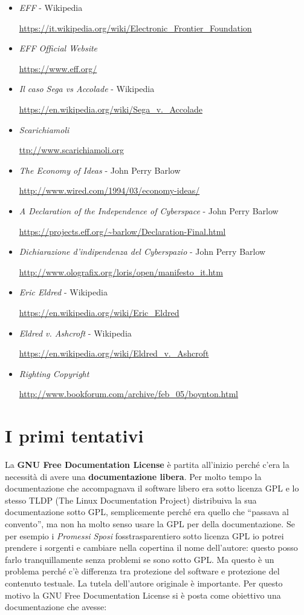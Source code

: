 \begin{itemize}
\item \textit{EFF} - Wikipedia 

\url{https://it.wikipedia.org/wiki/Electronic_Frontier_Foundation}
\item \textit{EFF Official Website}

 \url{https://www.eff.org/}
\item \textit{Il caso Sega vs Accolade} - Wikipedia 

\url{https://en.wikipedia.org/wiki/Sega_v._Accolade}
\item \textit{Scarichiamoli} 

\url{ttp://www.scarichiamoli.org}
\item \textit{The Economy of Ideas} - John Perry Barlow 

\url{http://www.wired.com/1994/03/economy-ideas/}
\item \textit{A Declaration of the Independence of Cyberspace} - John Perry Barlow 

\url{https://projects.eff.org/~barlow/Declaration-Final.html}
\item \textit{Dichiarazione d'indipendenza del Cyberspazio} - John Perry Barlow 

\url{http://www.olografix.org/loris/open/manifesto_it.htm}
\item \textit{Eric Eldred} -  Wikipedia

\url{https://en.wikipedia.org/wiki/Eric_Eldred}
\item \textit{Eldred v. Ashcroft} -  Wikipedia 

\url{https://en.wikipedia.org/wiki/Eldred_v._Ashcroft}
\item \textit{Righting Copyright} 

\url{http://www.bookforum.com/archive/feb_05/boynton.html}
\end{itemize}

\section{I primi tentativi}

La \textbf{GNU Free Documentation License} è partita all'inizio perché c'era la necessità di avere una \textbf{documentazione libera}. Per molto tempo la documentazione che accompagnava il software libero era sotto licenza GPL e lo stesso TLDP (The Linux Documentation Project) distribuiva la sua documentazione sotto GPL, semplicemente perché era quello che ``passava al convento'', ma non ha molto senso usare la GPL per della documentazione. Se per esempio i \textit{Promessi Sposi} fosstrasparentiero sotto licenza GPL io potrei prendere i sorgenti e cambiare nella copertina il nome dell'autore: questo posso farlo tranquillamente senza problemi se sono sotto GPL. Ma questo è un problema perché c'è differenza tra protezione del software e protezione del contenuto testuale. La tutela dell'autore originale è importante. Per questo motivo la GNU Free Documentation License si è posta come obiettivo una documentazione che avesse:

